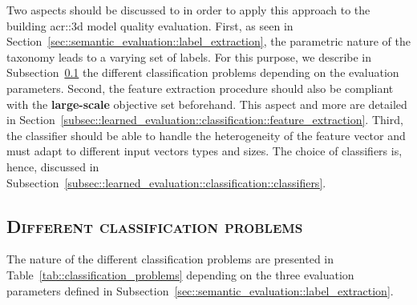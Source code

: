     Two aspects should be discussed to in order to apply this approach to the building \gls{acr::3d} model quality evaluation.
    First, as seen in Section~\ref{sec::semantic_evaluation::label_extraction}, the parametric nature of the taxonomy leads to a varying set of labels.
    For this purpose, we describe in Subsection~\ref{subsec::learned_evaluation::classification::different_porblems} the different classification problems depending on the evaluation parameters.
    Second, the feature extraction procedure should also be compliant with the \textbf{large-scale} objective set beforehand.
    This aspect and more are detailed in Section~\ref{subsec::learned_evaluation::classification::feature_extraction}.
    Third, the classifier should be able to handle the heterogeneity of the feature vector and must adapt to different input vectors types and sizes.
    The choice of classifiers is, hence, discussed in Subsection~\ref{subsec::learned_evaluation::classification::classifiers}.

    \subsection{\textsc{Different classification problems}}
        \label{subsec::learned_evaluation::classification::different_porblems}
        The nature of the different classification problems are presented in Table~\ref{tab::classification_problems} depending on the three evaluation parameters defined in Subsection~\ref{sec::semantic_evaluation::label_extraction}.\\

